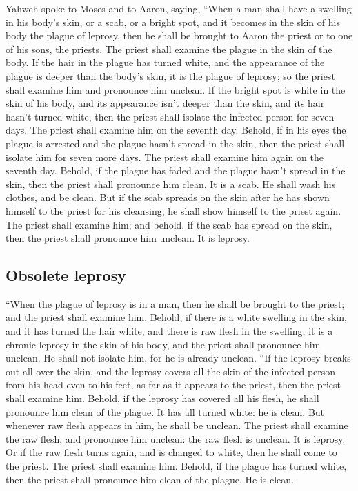  Yahweh spoke to Moses and to Aaron, saying,
 ``When a man shall have a swelling in his body's skin, or
a scab, or a bright spot, and it becomes in the skin of his body the
plague of leprosy, then he shall be brought to Aaron the priest or to
one of his sons, the priests.  The priest shall examine
the plague in the skin of the body. If the hair in the plague has turned
white, and the appearance of the plague is deeper than the body's skin,
it is the plague of leprosy; so the priest shall examine him and
pronounce him unclean.  If the bright spot is white in the
skin of his body, and its appearance isn't deeper than the skin, and its
hair hasn't turned white, then the priest shall isolate the infected
person for seven days.  The priest shall examine him on
the seventh day. Behold, if in his eyes the plague is arrested and the
plague hasn't spread in the skin, then the priest shall isolate him for
seven more days.  The priest shall examine him again on
the seventh day. Behold, if the plague has faded and the plague hasn't
spread in the skin, then the priest shall pronounce him clean. It is a
scab. He shall wash his clothes, and be clean.  But if the
scab spreads on the skin after he has shown himself to the priest for
his cleansing, he shall show himself to the priest again. 
The priest shall examine him; and behold, if the scab has spread on the
skin, then the priest shall pronounce him unclean. It is leprosy.

\hypertarget{obsolete-leprosy}{%
\subsection{Obsolete leprosy}\label{obsolete-leprosy}}

 ``When the plague of leprosy is in a man, then he shall
be brought to the priest;  and the priest shall examine
him. Behold, if there is a white swelling in the skin, and it has turned
the hair white, and there is raw flesh in the swelling, 
it is a chronic leprosy in the skin of his body, and the priest shall
pronounce him unclean. He shall not isolate him, for he is already
unclean.  ``If the leprosy breaks out all over the skin,
and the leprosy covers all the skin of the infected person from his head
even to his feet, as far as it appears to the priest, 
then the priest shall examine him. Behold, if the leprosy has covered
all his flesh, he shall pronounce him clean of the plague. It has all
turned white: he is clean.  But whenever raw flesh
appears in him, he shall be unclean.  The priest shall
examine the raw flesh, and pronounce him unclean: the raw flesh is
unclean. It is leprosy.  Or if the raw flesh turns again,
and is changed to white, then he shall come to the priest.
 The priest shall examine him. Behold, if the plague has
turned white, then the priest shall pronounce him clean of the plague.
He is clean.

